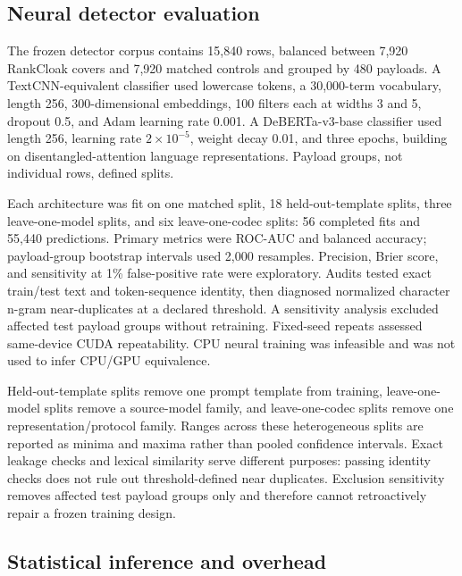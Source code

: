 \documentclass[fleqn,10pt]{wlscirep}
\begin{document}
\subsection*{Neural detector evaluation}\label{sec:detector-method}

The frozen detector corpus contains 15,840 rows, balanced between 7,920 RankCloak covers and 7,920 matched controls and grouped by 480 payloads. A TextCNN-equivalent classifier\cite{Kim2014CNN,Wen2019CNNTextSteganalysis} used lowercase tokens, a 30,000-term vocabulary, length 256, 300-dimensional embeddings, 100 filters each at widths 3 and 5, dropout 0.5, and Adam learning rate 0.001. A DeBERTa-v3-base classifier used length 256, learning rate \(2\times10^{-5}\), weight decay 0.01, and three epochs, building on disentangled-attention language representations\cite{He2021DeBERTa}. Payload groups, not individual rows, defined splits.

Each architecture was fit on one matched split, 18 held-out-template splits, three leave-one-model splits, and six leave-one-codec splits: 56 completed fits and 55,440 predictions. Primary metrics were ROC-AUC and balanced accuracy; payload-group bootstrap intervals used 2,000 resamples\cite{Efron1979Bootstrap}. Precision, Brier score, and sensitivity at 1\% false-positive rate were exploratory. Audits tested exact train/test text and token-sequence identity, then diagnosed normalized character n-gram near-duplicates at a declared threshold. A sensitivity analysis excluded affected test payload groups without retraining. Fixed-seed repeats assessed same-device CUDA repeatability. CPU neural training was infeasible and was not used to infer CPU/GPU equivalence.

Held-out-template splits remove one prompt template from training, leave-one-model splits remove a source-model family, and leave-one-codec splits remove one representation/protocol family. Ranges across these heterogeneous splits are reported as minima and maxima rather than pooled confidence intervals. Exact leakage checks and lexical similarity serve different purposes: passing identity checks does not rule out threshold-defined near duplicates. Exclusion sensitivity removes affected test payload groups only and therefore cannot retroactively repair a frozen training design.

\subsection*{Statistical inference and overhead}\label{sec:statistics-method}
\end{document}

